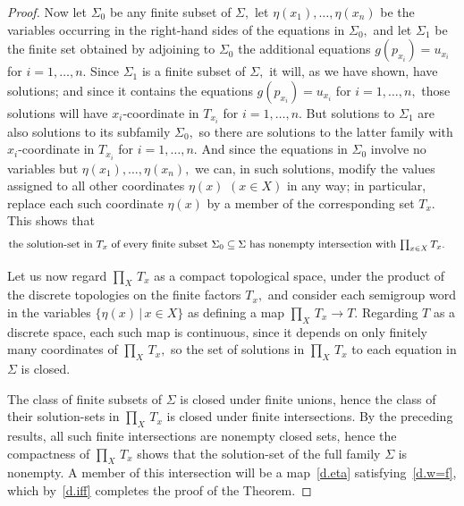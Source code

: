 \documentclass[10pt,a4paper]{amsart}
\begin{document}
\begin{proof}
Now let $\Sigma_0$ be any finite subset of $\Sigma,$ let
$\eta(x_1),\dots,\eta(x_n)$ be the variables occurring in
the right-hand sides of the equations in $\Sigma_0,$ and
let $\Sigma_1$ be the finite set obtained by adjoining to
$\Sigma_0$ the additional
equations $g(p_{x_i})=u_{x_i}$ for $i=1,\dots,n.$
Since $\Sigma_1$ is a finite subset
of $\Sigma,$ it will, as we have shown, have
solutions; and since it contains the equations
$g(p_{x_i}) = u_{x_i}$ for $i=1,\dots,n,$
those solutions will have $\!x_i\!$-coordinate in $T_{x_i}$
for $i=1,\dots,n.$
But solutions to $\Sigma_1$ are
also solutions to its subfamily $\Sigma_0,$ so
there are solutions to the latter family
with $\!x_i\!$-coordinate in $T_{x_i}$ for $i=1,\dots,n.$
And since the equations in $\Sigma_0$ involve no variables
but $\eta(x_1),\dots,\eta(x_n),$ we can, in such solutions,
modify the values assigned to all other coordinates
$\eta(x)$ $(x\in X)$
in any way; in particular, replace each such coordinate $\eta(x)$
by a member of the corresponding set $T_x.$
This shows that
%
\begin{equation}\begin{minipage}[c]{35pc}\label{d.in_prod_T_i}
the solution-set in $T_x$
of every finite subset $\Sigma_0\subseteq\Sigma$
has nonempty intersection with $\prod_{x\in X} T_x.$
\end{minipage}\end{equation}

Let us now regard $\prod_X\,T_x$
as a compact topological space, under the product of the
discrete topologies on the finite factors $T_x,$ and consider each
semigroup word in the variables $\{\eta(x)\,|\,x\in X\}$ as defining a
map $\prod_X\,T_x\to T.$
Regarding $T$ as a discrete space,
each such map is continuous, since it depends on only
finitely many coordinates of $\prod_X\,T_x,$ so the
set of solutions in $\prod_X\,T_x$ to
each equation in $\Sigma$ is closed.

The class of finite subsets of $\Sigma$ is closed
under finite unions, hence the class of their solution-sets in
$\prod_X\,T_x$ is closed under finite intersections.
By the preceding results, all such finite intersections are
nonempty closed sets,
hence the compactness of $\prod_X\,T_x$ shows that the solution-set of
the full family $\Sigma$ is nonempty.
A member of this intersection will be a map~\eqref{d.eta}
satisfying~\eqref{d.w=f},
which by~\eqref{d.iff} completes the proof of the Theorem.
\end{proof}
\end{document}
